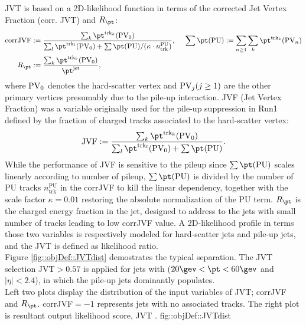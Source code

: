 JVT is based on a 2D-likelihood function in terms of the corrected Jet Vertex Fraction (corr. JVT) and $R_{\pt}$:
\begin{align}
\mathrm{corrJVF} & := \frac{ \sum_k \pttk (\pv_0)  }{\sum_l \pttl (\pv_0) + \sum\pt(\mathrm{PU})/ (\kappa \cdot n_{\mathrm{trk}}^{\mathrm{PU}} )  }
,  \,\,\,\,\,\,\,\,  \sum\pt(\mathrm{PU}) := \sum_{n \ge 1} \sum_k  \pttk (\pv_n)  \nn \\
R_{\pt} & := \frac{\sum_k \pttk (\pv_0) }{\pt^{\mathrm{jet}}},
\end{align}
where $\mathrm{PV}_0$ denotes the hard-scatter vertex and $\mathrm{PV}_j (j \ge 1)$ are the other primary vertices presumably due to the pile-up interaction. 
JVF (Jet Vertex Fraction) was a variable originally used for the pile-up suppression in Run1 \cite{JVF} defined by the fraction of charged tracks associated to the hard-scatter vertex:
\begin{align}
\mathrm{JVF} := \frac{ \sum_k \pttk (\pv_0)  }{ \sum_l \pttl (\pv_0) + \sum\pt(\mathrm{PU}) }.
\end{align}
While the performance of JVF is sensitive to the pileup since $\sum\pt(\mathrm{PU})$ scales linearly according to number of pileup, $\sum\pt(\mathrm{PU})$ is divided by the number of PU tracks $n_{\mathrm{trk}}^{\mathrm{PU}}$ in the corrJVF to kill the linear dependency, together with the scale factor $\kappa=0.01$ restoring the absolute normalization of the PU term.
$R_{\pt}$ is the charged energy fraction in the jet, designed to address to the jets with small number of tracks leading to low corrJVF value.
A 2D-likelihood profile in terms those two variables is respectively modeled for hard-scatter jets and pile-up jets, and the JVT is defined as likelihood ratio. \\

Figure \ref{fig::objDef::JVTdist} demostrates the typical separation.
The JVT selection JVT$>0.57$ is applied for jets with ($20 \gev < \pt< 60\gev$ and $|\eta|<2.4$), in which the pile-up jets dominantly populates.  \\


%

{Left two plots display the distribution of the input variables of JVT; corrJVF and $R_{\pt}$. corrJVF$=-1$ represents jets with no associated tracks. The right plot is resultant output likelihood score,  JVT  \cite{155_JVT}.
}
{fig::objDef::JVTdist}

